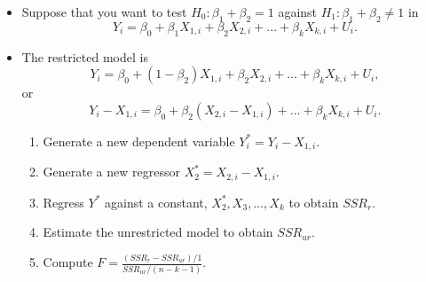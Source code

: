 \documentclass[notes=show,compress,beamer]{beamer}
\begin{document}
\begin{frame}%


\begin{itemize}
\item Suppose that you want to test $H_{0}:\beta _{1}+\beta _{2}=1$ against $%
H_{1}:\beta _{1}+\beta _{2}\neq 1$ in%
\begin{equation*}
Y_{i}=\beta _{0}+\beta _{1}X_{1,i}+\beta _{2}X_{2,i}+\ldots +\beta
_{k}X_{k,i}+U_{i}.
\end{equation*}%
\pause%

\item The 
\color{red}%
restricted 
\color{black}%
model is%
\begin{equation*}
Y_{i}=\beta _{0}+\left( 1-\beta _{2}\right) X_{1,i}+\beta _{2}X_{2,i}+\ldots
+\beta _{k}X_{k,i}+U_{i},
\end{equation*}%
\pause%
or%
\begin{equation*}
Y_{i}-X_{1,i}=\beta _{0}+\beta _{2}\left( X_{2,i}-X_{1,i}\right) +\ldots
+\beta _{k}X_{k,i}+U_{i}.
\end{equation*}%
\pause%

\begin{enumerate}
\item Generate a new dependent variable $Y_{i}^{\ast }=Y_{i}-X_{1,i}.$%
\pause%

\item Generate a new regressor $X_{2}^{\ast }=X_{2,i}-X_{1,i}.$%
\pause%

\item Regress $Y^{\ast }$ against a constant, $X_{2}^{\ast },X_{3},\ldots
,X_{k}$ to obtain $SSR_{r}.$%
\pause%

\item Estimate the unrestricted model to obtain $SSR_{ur}.$%
\pause%

\item Compute $F=\frac{\left( SSR_{r}-SSR_{ur}\right) /1}{SSR_{ur}/\left(
n-k-1\right) }.$
\end{enumerate}
\end{itemize}

\end{frame}%
\end{document}
